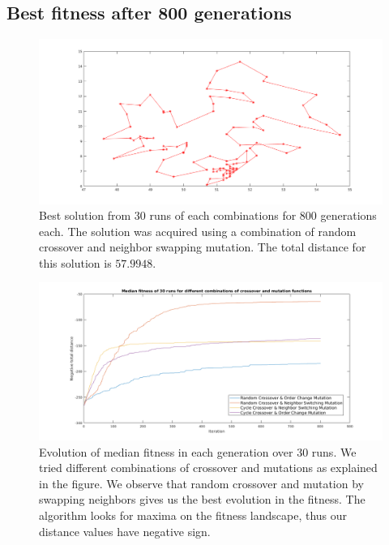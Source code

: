 \documentclass[14pt,a4paper,openright,twoside]{extreport}
\begin{document}
\subsection*{\textbf{Best fitness after 800 generations}}
\begin{figure}[H]
\begin{center}
\includegraphics[width=\textwidth]{tspmap_randomcross_neighbormutate_800_after.png}
\caption{\small{Best solution from 30 runs of each combinations for 800 generations each. The solution was acquired using a combination of random crossover and neighbor swapping mutation. The total distance for this solution is $57.9948$.}}
\label{converge}
\end{center}
\end{figure}

\begin{figure}[H]
\begin{center}
\includegraphics[width=\textwidth]{tsp_fitness_all_combinations_800.png}
\caption{\small{Evolution of median fitness in each generation over 30 runs. We tried different combinations of crossover and mutations as explained in the figure. We observe that random crossover and mutation by swapping neighbors gives us the best evolution in the fitness. The algorithm looks for maxima on the fitness landscape, thus our distance values have negative sign.}}
\label{statistics}
\end{center}
\end{figure}


\end{document}
